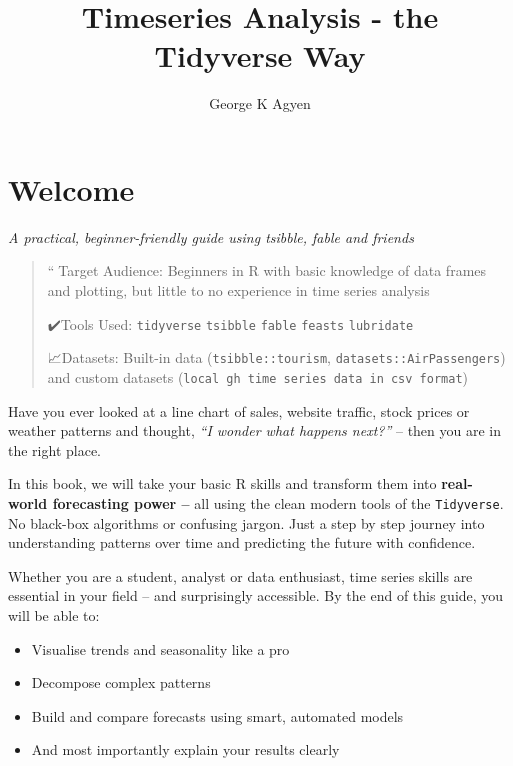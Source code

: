 \documentclass[
  letterpaper,
  DIV=11,
  numbers=noendperiod]{scrreprt}
\title{Timeseries Analysis - the Tidyverse Way}
\author{George K Agyen}
\date{}
\renewcommand*\contentsname{Table of contents}
\newcommand\contentsname{Table of contents}
\begin{document}
\maketitle

\renewcommand*\contentsname{Table of contents}
{
\hypersetup{linkcolor=}
\setcounter{tocdepth}{2}
\tableofcontents
}


\chapter*{Welcome}\label{welcome}


\emph{A practical, beginner-friendly guide using tsibble, fable and
friends}

\begin{quote}
``📌Target Audience: Beginners in R with basic knowledge of data frames
and plotting, but little to no experience in time series analysis

✔️Tools Used: \texttt{tidyverse} \texttt{tsibble} \texttt{fable}
\texttt{feasts} \texttt{lubridate}

📈Datasets: Built-in data (\texttt{tsibble::tourism},
\texttt{datasets::AirPassengers}) and custom datasets
(\texttt{local\ gh\ time\ series\ data\ in\ csv\ format})
\end{quote}

Have you ever looked at a line chart of sales, website traffic, stock
prices or weather patterns and thought, \emph{``I wonder what happens
next?''} -- then you are in the right place.

In this book, we will take your basic R skills and transform them into
\textbf{real-world forecasting power --} all using the clean modern
tools of the \texttt{Tidyverse}. No black-box algorithms or confusing
jargon. Just a step by step journey into understanding patterns over
time and predicting the future with confidence.

Whether you are a student, analyst or data enthusiast, time series
skills are essential in your field -- and surprisingly accessible. By
the end of this guide, you will be able to:

\begin{itemize}
\item
  Visualise trends and seasonality like a pro
\item
  Decompose complex patterns
\item
  Build and compare forecasts using smart, automated models
\item
  And most importantly explain your results clearly
\end{itemize}
\end{document}
